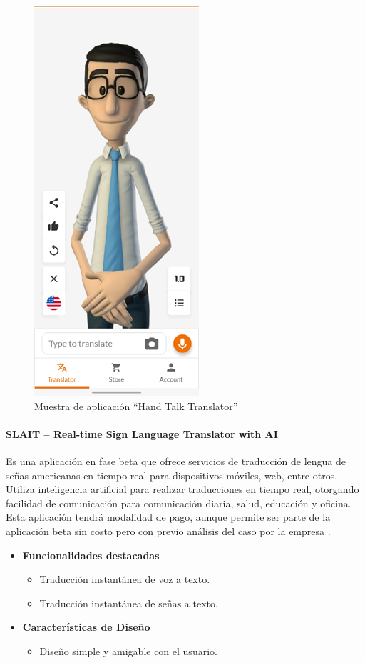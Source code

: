 \begin{figure} [h]
    \centering
    \includegraphics[width=0.25\linewidth]{figuras/handTalk.png}
    \caption{Muestra de aplicación “Hand Talk Translator”}
    \label{fig:enter-label}
\end{figure}


\paragraph{SLAIT – Real-time Sign Language Translator with AI}

Es una aplicación en fase beta que ofrece servicios de traducción de lengua de señas americanas en tiempo real para dispositivos móviles, web, entre otros. Utiliza inteligencia artificial para realizar traducciones en tiempo real, otorgando facilidad de comunicación para comunicación diaria, salud, educación y oficina. Esta aplicación tendrá modalidad de pago, aunque permite ser parte de la aplicación beta sin costo pero con previo análisis del caso por la empresa \cite{SLAIT}.

\begin{itemize}
    \item \textbf{Funcionalidades destacadas}
    \begin{itemize}
        \item Traducción instantánea de voz a texto.
        \item Traducción instantánea de señas a texto.
    \end{itemize}

    \item \textbf{Características de Diseño}
    \begin{itemize}
        \item Diseño simple y amigable con el usuario.
    \end{itemize}
\end{itemize}

